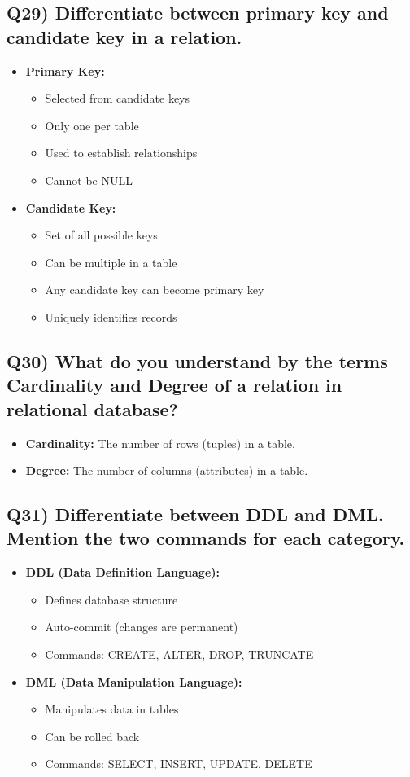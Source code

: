 \documentclass{article}
\begin{document}
\subsection*{Q29) Differentiate between primary key and candidate key in a relation.}
\begin{itemize}
\item \textbf{Primary Key:}
\begin{itemize}
\item Selected from candidate keys
\item Only one per table
\item Used to establish relationships
\item Cannot be NULL
\end{itemize}

\item \textbf{Candidate Key:}
\begin{itemize}
\item Set of all possible keys
\item Can be multiple in a table
\item Any candidate key can become primary key
\item Uniquely identifies records
\end{itemize}
\end{itemize}

\subsection*{Q30) What do you understand by the terms Cardinality and Degree of a relation in relational database?}
\begin{itemize}
\item \textbf{Cardinality:} The number of rows (tuples) in a table.
\item \textbf{Degree:} The number of columns (attributes) in a table.
\end{itemize}

\subsection*{Q31) Differentiate between DDL and DML. Mention the two commands for each category.}
\begin{itemize}
\item \textbf{DDL (Data Definition Language):}
\begin{itemize}
\item Defines database structure
\item Auto-commit (changes are permanent)
\item Commands: CREATE, ALTER, DROP, TRUNCATE
\end{itemize}

\item \textbf{DML (Data Manipulation Language):}
\begin{itemize}
\item Manipulates data in tables
\item Can be rolled back
\item Commands: SELECT, INSERT, UPDATE, DELETE
\end{itemize}
\end{itemize}
\end{document}
